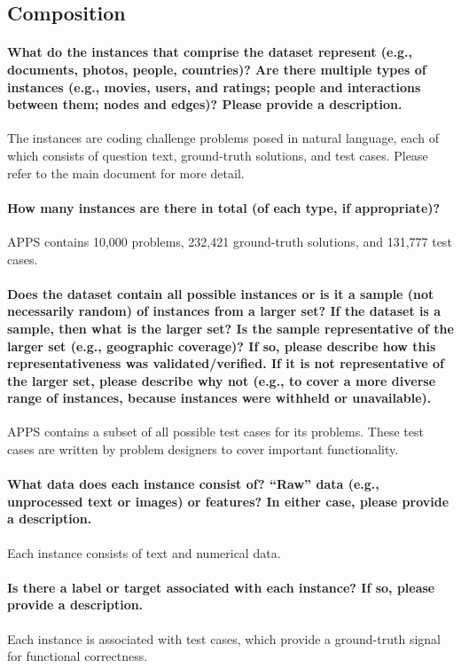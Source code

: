 \documentclass{article}
\begin{document}
\subsection{Composition}
\paragraph{What do the instances that comprise the dataset represent (e.g.,
documents, photos, people, countries)? Are there multiple types of
instances (e.g., movies, users, and ratings; people and interactions between them; nodes and edges)? Please provide a description.}
The instances are coding challenge problems posed in natural language, each of which consists of question text, ground-truth solutions, and test cases. Please refer to the main document for more detail.

\paragraph{How many instances are there in total (of each type, if appropriate)?}
APPS contains 10,000 problems, 232,421 ground-truth solutions, and 131,777 test cases.

\paragraph{Does the dataset contain all possible instances or is it a sample
(not necessarily random) of instances from a larger set? If the
dataset is a sample, then what is the larger set? Is the sample representative of the larger set (e.g., geographic coverage)? If so, please describe how
this representativeness was validated/verified. If it is not representative
of the larger set, please describe why not (e.g., to cover a more diverse
range of instances, because instances were withheld or unavailable).}
APPS contains a subset of all possible test cases for its problems. These test cases are written by problem designers to cover important functionality.

\paragraph{What data does each instance consist of? “Raw” data (e.g., unprocessed text or images) or features? In either case, please provide a description.}
Each instance consists of text and numerical data.

\paragraph{Is there a label or target associated with each instance? If so, please
provide a description.}
Each instance is associated with test cases, which provide a ground-truth signal for functional correctness.
\end{document}
